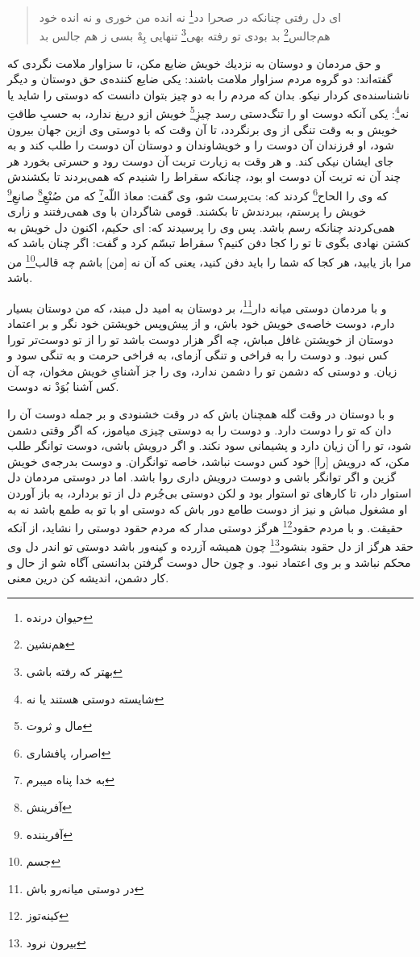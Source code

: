 \begin{quote}
اى دل رفتى چنانكه در صحرا دد\footnote{حیوان درنده} \quad \quad نه انده من خورى و نه انده خود \\
هم‌جالس\footnote{هم‌نشین} بد بودى تو رفته بهى\footnote{بهتر که رفته باشی} \quad \quad تنهايى بِهْ بسى ز هم جالس بد
\end{quote}


و حق مردمان و دوستان به نزديك خويش ضايع مكن، تا سزاوار ملامت نگردى كه گفته‌اند: دو گروه مردم سزاوار ملامت باشند: يكى ضايع كننده‌ی حق دوستان و ديگر ناشناسنده‌ی كردار نيكو. بدان كه مردم را به دو چيز بتوان دانست كه دوستى را شايد يا نه\footnote{شایسته دوستی هستند یا نه}: يكى آنكه دوست او را تنگ‌دستى رسد چيزِ\footnote{مال و ثروت} خويش ازو دريغ ندارد، به حسبِ طاقتِ خويش و به وقت تنگى از وى برنگردد، تا آن وقت كه با دوستى وى ازين جهان بيرون شود، او فرزندان آن دوست را و خويشاوندان و دوستان آن دوست را طلب كند و به جاى ايشان نيكى كند. و هر وقت به زيارت تربت آن دوست رود و حسرتى بخورد هر چند آن نه تربت آن دوست او بود، چنانكه سقراط را شنيدم كه همى‌بردند تا بكشندش كه وى را الحاح\footnote{اصرار، پافشاری} كردند كه: بت‌پرست شو، وى گفت: معاذ اللّه\footnote{به‌ خدا پناه میبرم} كه من صُنْعِ\footnote{آفرینش} صانعِ\footnote{آفریننده} خويش را پرستم، ببردندش تا بكشند. قومى شاگردان با وى همى‌رفتند و زارى همى‌كردند چنانكه رسم باشد. پس وى را پرسيدند كه: اى حكيم، اكنون دل خويش به كشتن نهادى بگوى تا تو را كجا دفن كنيم‌؟ سقراط تبسّم كرد و گفت: اگر چنان باشد كه مرا باز يابيد، هر كجا كه شما را بايد دفن كنيد، يعنى كه آن نه [من] باشم چه قالب\footnote{جسم} من باشد.

و با مردمان دوستى ميانه دار\footnote{در دوستی میانه‌رو باش}، بر دوستان به اميد دل مبند، كه من دوستان بسيار دارم، دوست خاصه‌ی خويش خود باش، و از پيش‌وپس خويشتن خود نگر و بر اعتماد دوستان از خويشتن غافل مباش، چه اگر هزار دوست باشد تو را از تو دوست‌تر تورا كس نبود. و دوست را به فراخى و تنگى آزماى، به فراخى حرمت و به تنگى سود و زيان. و دوستى كه دشمن تو را دشمن ندارد، وى را جز آشناىِ خويش مخوان، چه آن كس آشنا بُوَدْ نه دوست. 

و با دوستان در وقت گله همچنان باش كه در وقت خشنودى و بر جمله دوست آن را دان كه تو را دوست دارد. و دوست را به دوستى چيزى مياموز، كه اگر وقتى دشمن شود، تو را آن زيان دارد و پشيمانى سود نكند. و اگر درويش باشى، دوست توانگر طلب مكن، كه درويش [را] خود كس دوست نباشد، خاصه توانگران. و دوست بدرجه‌ی خويش گزين و اگر توانگر باشى و دوست درويش دارى روا باشد. اما در دوستى مردمان دل استوار دار، تا كارهاى تو استوار بود و لكن دوستى بى‌جُرم دل از تو بردارد، به باز آوردن او مشغول مباش و نيز از دوست طامع دور باش كه دوستى او با تو به طمع باشد نه به حقيقت. و با مردم حقود\footnote{کینه‌توز} هرگز دوستى مدار كه مردم حقود دوستى را نشايد، از آنكه حقد هرگز از دل حقود بنشود\footnote{بیرون نرود} چون هميشه آزرده و كينه‌ور باشد دوستى تو اندر دل وى محكم نباشد و بر وى اعتماد نبود. و چون حال دوست گرفتن بدانستى آگاه شو از حال و كار دشمن، انديشه كن درين معنى.





\newpage















